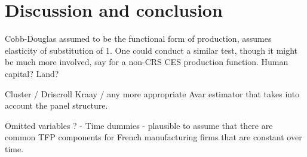 \section{Discussion and conclusion}

Cobb-Douglas assumed to be the functional form of production, assumes elasticity of substitution of 1. One could conduct a similar test, though it might be much more involved, say for a non-CRS CES production function. Human capital? Land? 

Cluster / Driscroll Kraay / any more appropriate Avar estimator that takes into account the panel structure. 

Omitted variables ? - Time dummies -\> plausible to assume that there are common TFP components for French manufacturing firms that are constant over time.